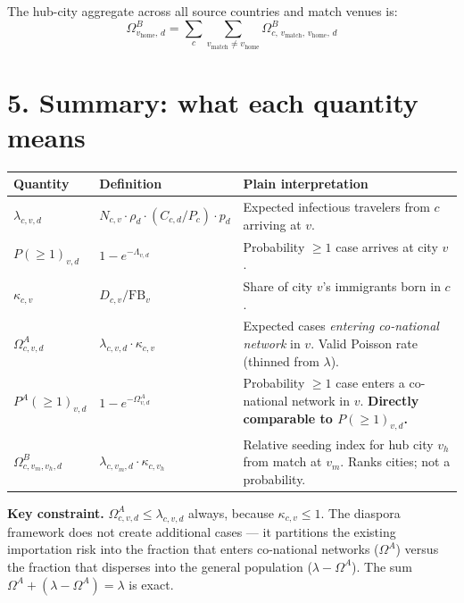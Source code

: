 \documentclass[11pt]{article}
\begin{document}
The hub-city aggregate across all source countries and match venues is:
\[
  \Omega^B_{v_{\text{home}},\,d}
    = \sum_c \sum_{v_{\text{match}} \neq v_{\text{home}}}
      \Omega^B_{c,\,v_{\text{match}},\,v_{\text{home}},\,d}
\]

\section*{5. Summary: what each quantity means}

\begin{center}
\small
\begin{tabular}{p{2.8cm} p{4.2cm} p{5.8cm}}
\toprule
\textbf{Quantity} & \textbf{Definition} & \textbf{Plain interpretation} \\
\midrule
$\lambda_{c,v,d}$ &
  $N_{c,v} \cdot \rho_d \cdot (C_{c,d}/P_c) \cdot p_d$ &
  Expected infectious travelers from $c$ arriving at $v$. \\[6pt]
$P(\geq 1)_{v,d}$ &
  $1 - e^{-\Lambda_{v,d}}$ &
  Probability $\geq 1$ case arrives at city $v$. \\[6pt]
$\kappa_{c,v}$ &
  $D_{c,v} / \mathrm{FB}_{v}$ &
  Share of city $v$'s immigrants born in $c$. \\[6pt]
$\Omega^A_{c,v,d}$ &
  $\lambda_{c,v,d} \cdot \kappa_{c,v}$ &
  Expected cases \emph{entering co-national network} in $v$.
  Valid Poisson rate (thinned from $\lambda$). \\[6pt]
$P^A(\geq 1)_{v,d}$ &
  $1 - e^{-\Omega^A_{v,d}}$ &
  Probability $\geq 1$ case enters a co-national network in $v$.
  \textbf{Directly comparable to $P(\geq 1)_{v,d}$.} \\[6pt]
$\Omega^B_{c,v_m,v_h,d}$ &
  $\lambda_{c,v_m,d} \cdot \kappa_{c,v_h}$ &
  Relative seeding index for hub city $v_h$ from match at $v_m$.
  Ranks cities; not a probability. \\
\bottomrule
\end{tabular}
\end{center}

\bigskip
\noindent\textbf{Key constraint.} $\Omega^A_{c,v,d} \leq \lambda_{c,v,d}$
always, because $\kappa_{c,v} \leq 1$. The diaspora framework does not
create additional cases --- it partitions the existing importation risk
into the fraction that enters co-national networks ($\Omega^A$) versus
the fraction that disperses into the general population
($\lambda - \Omega^A$). The sum $\Omega^A + (\lambda - \Omega^A) = \lambda$
is exact.
\end{document}
